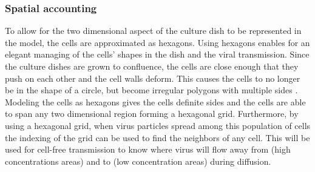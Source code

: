 

\subsubsection{Spatial accounting} \label{Spatial_accounting}

To allow for the two dimensional aspect of the culture dish to be represented in the model, the cells are approximated as hexagons. Using hexagons enables for an elegant managing of the cells' shapes in the dish and the viral transmission. Since the culture dishes are grown to confluence, the cells are close enough that they push on each other and the cell walls deform. This causes the cells to no longer be in the shape of a circle, but become irregular polygons with multiple sides \cite{bruckner_importance_2018}. Modeling the cells as hexagons gives the cells definite sides and the cells are able to span any two dimensional region forming a hexagonal grid. Furthermore, by using a hexagonal grid, when virus particles spread among this population of cells the indexing of the grid can be used to find the neighbors of any cell. This will be used for cell-free transmission to know where virus will flow away from (high concentrations areas) and to (low concentration areas) during diffusion. 

